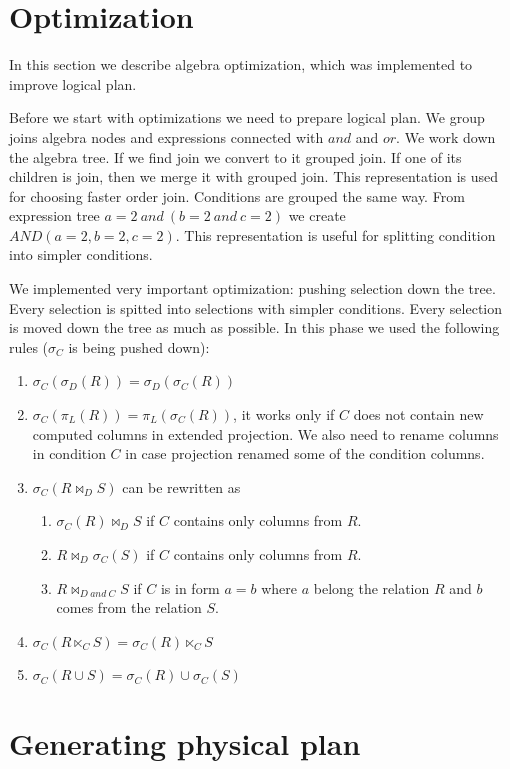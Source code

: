 \section{Optimization}

In this section we describe algebra optimization, which was implemented to improve logical plan.

Before we start with optimizations we need to prepare logical plan. We group joins algebra nodes and expressions connected with $and$ and $or$. We work down the algebra tree. If we find join we convert to it grouped join. If one of its children is join, then we merge it with grouped join. This representation is used for choosing faster order join. Conditions are grouped the same way. From expression tree $a=2~and~(b=2~and~c=2)$ we create $AND(a=2,b=2,c=2)$. This representation is useful for splitting condition into simpler conditions.

We implemented very important optimization: pushing selection down the tree. Every selection is spitted into selections with simpler conditions. Every selection is moved down the tree as much as possible. In this phase we used the following rules ($\sigma_C$ is being pushed down):
\begin{enumerate}
\item $\sigma_C(\sigma_D(R))=\sigma_D(\sigma_C(R))$
\item $\sigma_C(\pi_L(R))=\pi_L(\sigma_C(R))$, it works only if $C$ does not contain new computed columns in extended projection. We also need to rename columns in condition $C$ in case projection renamed some of the condition columns.
\item  $\sigma_C(R \Join_D S)$ can be rewritten as
\begin{enumerate}
\item $\sigma_C(R) \Join_D S$ if $C$ contains only columns from $R$.
\item $R \Join_D \sigma_C(S)$ if $C$ contains only columns from $R$.
\item $R \Join_{D~and~C} S$ if $C$ is in form $a=b$ where $a$ belong the relation $R$ and $b$ comes from the relation $S$.
\end{enumerate}
\item $\sigma_C(R \ltimes_C S)=\sigma_C(R)\ltimes_C S$
\item $\sigma_C(R\cup S)=\sigma_C(R)\cup \sigma_C(S)$
\end{enumerate}

\section{Generating physical plan}

